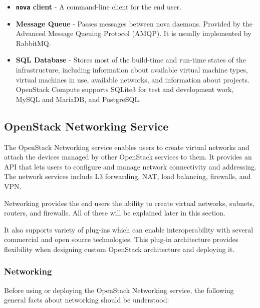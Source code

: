 \begin{itemize}
  \item{\textbf{\texttt{nova} client} - A command-line client for the end user.}
  \item{\textbf{Message Queue} - Passes messages between nova daemons. Provided by the Advanced Message Queuing Protocol (AMQP). It is usually implemented by RabbitMQ.}
  \item{\textbf{SQL Database} - Stores most of the build-time and run-time states of the infrastructure, including information about available virtual machine types, virtual machines in use, available networks, and information about projects. OpenStack Compute supports SQLite3 for test and development work, MySQL and MariaDB, and PostgreSQL.}
  \\\cite{InstallGuide}
\end{itemize}



\subsection{OpenStack Networking Service}
The OpenStack Networking service enables users to create virtual networks and attach the devices managed by other OpenStack services to them. It provides an API that lets users to configure and manage network connectivity and addressing. The network services include L3 forwarding, NAT, load balancing, firewalls, and VPN.

Networking provides the end users the ability to create virtual networks, subnets, routers, and firewalls. All of these will be explained later in this section.

It also supports variety of plug-ins which can enable interoperability with several commercial and open source technologies. This plug-in architecture provides flexibility when designing custom OpenStack architecture and deploying it.

\subsubsection*{Networking}
Before using or deploying the OpenStack Networking service, the following general facts about networking \cite{NetworkingGuide} should be understood:

